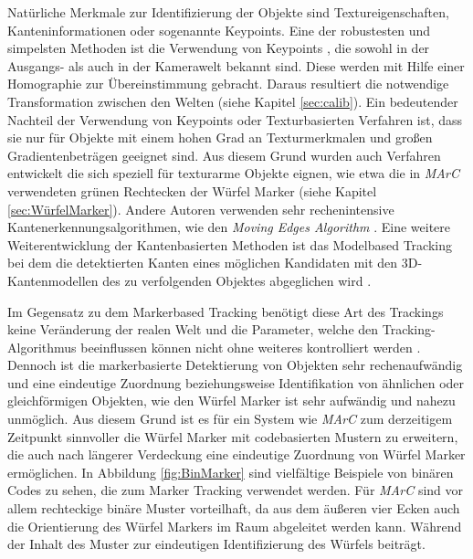 Natürliche Merkmale zur Identifizierung der Objekte sind Textureigenschaften, Kanteninformationen oder sogenannte Keypoints. Eine der robustesten und simpelsten Methoden ist die Verwendung von Keypoints \cite{article:MarkerLessBarandiaran2010}\cite{article:MarkerLessWagner:}\cite{article:MarkerLessComport}\cite{article:MarkerLessLowe}, die sowohl in der Ausgangs- als auch in der Kamerawelt bekannt sind. Diese werden mit Hilfe einer Homographie zur Übereinstimmung gebracht. Daraus resultiert die notwendige Transformation zwischen den Welten (siehe Kapitel \ref{sec:calib}). Ein bedeutender Nachteil der Verwendung von Keypoints oder Texturbasierten Verfahren ist, dass sie nur für Objekte mit einem hohen Grad an Texturmerkmalen und großen Gradientenbeträgen geeignet sind. Aus diesem Grund wurden auch Verfahren \cite{article:MarkerLessStrucktHinterstoisser}\cite{article:MarkerLessStrucktDamen}\cite{article:MarkerLessStrucktPark} entwickelt die sich speziell für texturarme Objekte eignen, wie etwa die in \textit{MArC} verwendeten grünen Rechtecken der Würfel Marker (siehe Kapitel \ref{sec:WürfelMarker}). Andere Autoren verwenden sehr rechenintensive Kantenerkennungsalgorithmen, wie den \textit{Moving Edges Algorithm} \cite{article:MarkerLessEdgeMarchand}. Eine weitere Weiterentwicklung der Kantenbasierten Methoden ist das Modelbased Tracking bei dem die detektierten Kanten eines möglichen Kandidaten mit den 3D-Kantenmodellen des zu verfolgenden Objektes abgeglichen wird \cite{article:MarkerLessModellVacchetti}\cite{article:MarkerLessEdgeAlvarez}\cite{article:MarkerLessEdgeWu}\cite{article:MarkerLessBlasko}.

Im Gegensatz zu dem Markerbased Tracking benötigt diese Art des Trackings keine Veränderung der realen Welt und die Parameter, welche den Tracking-Algorithmus beeinflussen können nicht ohne weiteres kontrolliert werden \cite{article:MarkerLessBarandiaran2010}. Dennoch ist die markerbasierte Detektierung von Objekten sehr rechenaufwändig und eine eindeutige Zuordnung beziehungsweise Identifikation von ähnlichen oder gleichförmigen Objekten, wie den Würfel Marker ist sehr aufwändig und nahezu unmöglich. Aus diesem Grund ist es für ein System wie \textit{MArC} zum derzeitigem Zeitpunkt sinnvoller die Würfel Marker mit codebasierten Mustern zu erweitern, die auch nach längerer Verdeckung eine eindeutige Zuordnung von Würfel Marker ermöglichen. In Abbildung \ref{fig:BinMarker} sind vielfältige Beispiele von binären Codes zu sehen, die zum Marker Tracking verwendet werden. Für \textit{MArC} sind vor allem rechteckige binäre Muster vorteilhaft, da aus dem äußeren vier Ecken auch die Orientierung des Würfel Markers im Raum abgeleitet werden kann. Während der Inhalt des Muster zur eindeutigen Identifizierung des Würfels beiträgt. 

